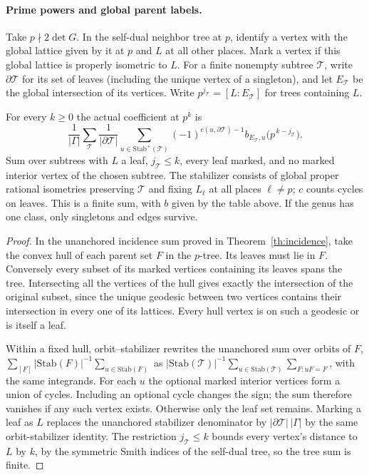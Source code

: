 \paragraph{Prime powers and global parent labels.}
Take $p\nmid 2\det G$. In the self-dual neighbor tree at $p$, identify
a vertex with the global lattice given by it at $p$ and $L$ at all
other places. Mark a vertex if this global lattice is properly
isometric to $L$. For a finite nonempty subtree $\mathcal T$, write $\partial\mathcal T$ for its set
of leaves (including the unique vertex of a singleton), and let
$E_{\mathcal T}$ be the global intersection of its vertices. Write
$p^{j_{\mathcal T}}=[L:E_{\mathcal T}]$ for trees containing $L$.
\begin{theorem}\label{th:ternary-hull}
For every $k\ge0$ the actual coefficient at $p^k$ is
\[
 \frac1{|\Gamma|}
 \sum_{\mathcal T}\frac1{|\partial\mathcal T|}
  \sum_{u\in\mathrm{Stab}^+(\mathcal T)}
      (-1)^{c(u,\partial\mathcal T)-1}
      b_{E_{\mathcal T},u}\big(p^{\,k-j_{\mathcal T}}\big).
\]
Sum over subtrees with $L$ a leaf, $j_{\mathcal T}\le k$, every leaf marked, and
no marked interior vertex of the chosen subtree. The stabilizer consists of global
proper rational isometries preserving $\mathcal T$ and fixing $L_\ell$
at all places $\ell\ne p$; $c$ counts cycles on leaves. This is a
finite sum, with $b$ given by the table above. If the genus has
one class, only singletons and edges survive.
\end{theorem}
\begin{proof}
In the unanchored incidence sum proved in Theorem~\ref{th:incidence},
take the convex hull of each parent set $F$ in the $p$-tree. Its
leaves must lie in $F$. Conversely every subset of its marked
vertices containing its leaves spans the tree. Intersecting all the
vertices of the hull gives exactly the intersection of the original
subset, since the unique geodesic between two vertices contains
their intersection in every one of its lattices. Every hull vertex is
on such a geodesic or is itself a leaf.

Within a fixed hull, orbit--stabilizer rewrites the unanchored
sum over orbits of $F$,
$\sum_{[F]}|\mathrm{Stab}(F)|^{-1}\sum_{u\in\mathrm{Stab}(F)}$
as $|\mathrm{Stab}(\mathcal T)|^{-1}\sum_{u\in\mathrm{Stab}(\mathcal T)}
\sum_{F:uF=F}$, with the same integrands. For each $u$ the optional
marked interior vertices form a union of cycles. Including an
optional cycle changes the sign; the sum therefore vanishes if any
such vertex exists. Otherwise only the leaf set remains. Marking a
leaf as $L$ replaces the unanchored stabilizer denominator by
$|\partial\mathcal T|\,|\Gamma|$ by the same orbit-stabilizer identity. The
restriction $j_{\mathcal T}\le k$ bounds every vertex's distance to $L$ by
$k$, by the symmetric Smith indices of the self-dual tree, so the
tree sum is finite.
\end{proof}

